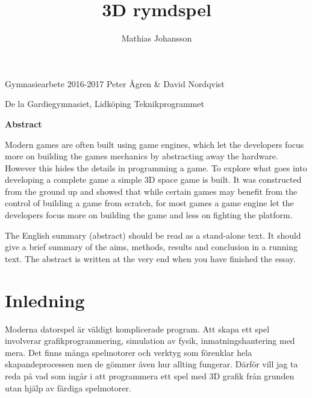 \documentclass[12pt, a4paper]{article}
\title{3D rymdspel}
\author{Mathias Johansson}
\begin{document}
	\maketitle
	
	\vfill
	
	\begin{center}
		{Gymnasiearbete 2016-2017 \hfill Peter Ågren \& David Nordqvist}
	\end{center}
	
	\begin{center}
		{De la Gardiegymnasiet, Lidköping \hfill Teknikprogrammet}
	\end{center}
	
	\newpage
	
	\begin{center}
		\Large\textbf{Abstract}
	\end{center}
	
	Modern games are often built using game engines, which let the developers focus more on building the games mechanics by abstracting away the hardware. However this hides the details in programming a game. To explore what goes into developing a complete game a simple 3D space game is built. It was constructed from the ground up and showed that while certain games may benefit from the control of building a game from scratch, for most games a game engine let the developers focus more on building the game and less on fighting the platform. 
	
	\begin{small}
		The English summary (abstract) should be read as a stand-alone text. It should
give a brief summary of the aims, methods, results and conclusion in a running
text. The abstract is written at the very end when you have finished the essay.
	\end{small}
	
	\newpage
	
	\tableofcontents
	
	\newpage
	
	\section{Inledning}

	Moderna datorspel är väldigt komplicerade program. Att skapa ett spel involverar grafikprogrammering, simulation av fysik, inmatningshantering med mera. Det finns många spelmotorer och verktyg som förenklar hela skapandeprocessen men de gömmer även hur allting fungerar. Därför vill jag ta reda på vad som ingår i att programmera ett spel med 3D grafik från grunden utan hjälp av färdiga spelmotorer. 
	
\end{document}
